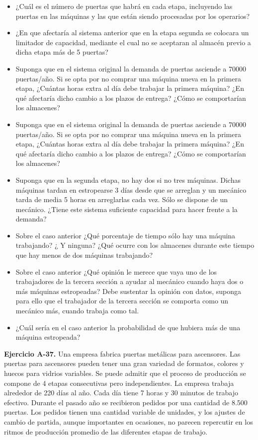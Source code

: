 \documentclass[
]{book}
\providecommand{\tightlist}{%
  \setlength{\itemsep}{0pt}\setlength{\parskip}{0pt}}
\theoremstyle{definition}
\theoremstyle{definition}
\theoremstyle{definition}
\theoremstyle{definition}
\theoremstyle{remark}
\begin{document}
\begin{itemize}
\tightlist
\item
  ¿Cuál es el número de puertas que habrá en cada etapa, incluyendo las puertas en las máquinas y las que están siendo procesadas por los operarios?
\item
  ¿En que afectaría al sistema anterior que en la etapa segunda se colocara un limitador de capacidad, mediante el cual no se aceptaran al almacén previo a dicha etapa más de 5 puertas?
\item
  Suponga que en el sistema original la demanda de puertas asciende a 70000 puertas/año. Si se opta por no comprar una máquina nueva en la primera etapa, ¿Cuántas horas extra al día debe trabajar la primera máquina? ¿En qué afectaría dicho cambio a los plazos de entrega? ¿Cómo se comportarían los almacenes?
\item
  Suponga que en el sistema original la demanda de puertas asciende a 70000 puertas/año. Si se opta por no comprar una máquina nueva en la primera etapa, ¿Cuántas horas extra al día debe trabajar la primera máquina? ¿En qué afectaría dicho cambio a los plazos de entrega? ¿Cómo se comportarían los almacenes?
\item
  Suponga que en la segunda etapa, no hay dos si no tres máquinas. Dichas máquinas tardan en estropearse 3 días desde que se arreglan y un mecánico tarda de media 5 horas en arreglarlas cada vez. Sólo se dispone de un mecánico. ¿Tiene este sistema suficiente capacidad para hacer frente a la demanda?
\item
  Sobre el caso anterior ¿Qué porcentaje de tiempo sólo hay una máquina trabajando? ¿ Y ninguna? ¿Qué ocurre con los almacenes durante este tiempo que hay menos de dos máquinas trabajando?
\item
  Sobre el caso anterior ¿Qué opinión le merece que vaya uno de los trabajadores de la tercera sección a ayudar al mecánico cuando haya dos o más máquinas estropeadas? Debe sustentar la opinión con datos, suponga para ello que el trabajador de la tercera sección se comporta como un mecánico más, cuando trabaja como tal.
\item
  ¿Cuál sería en el caso anterior la probabilidad de que hubiera más de una máquina estropeada?
\end{itemize}

\textbf{Ejercicio A-37.} Una empresa fabrica puertas metálicas para ascensores. Las puertas para ascensores pueden tener una gran variedad de formatos, colores y huecos para vidrios variables. Se puede admitir que el proceso de producción se compone de 4 etapas consecutivas pero independientes. La empresa trabaja alrededor de 220 días al año. Cada día tiene 7 horas y 30 minutos de trabajo efectivo. Durante el pasado año se recibieron pedidos por una cantidad de 8.500 puertas. Los pedidos tienen una cantidad variable de unidades, y los ajustes de cambio de partida, aunque importantes en ocasiones, no parecen repercutir en los ritmos de producción promedio de las diferentes etapas de trabajo.
\end{document}
